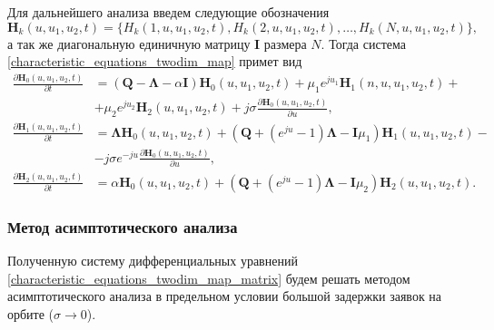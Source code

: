 Для дальнейшего анализа введем следующие обозначения
\begin{equation*}	
\boldsymbol{H}_{k}(u,u_{1},u_{2},t) = \{H_{k}(1,u,u_{1},u_{2},t),H_{k}(2,u,u_{1},u_{2},t),\dots,H_{k}(N,u,u_{1},u_{2},t)\},
\end{equation*}
а так же диагональную единичную матрицу $\boldsymbol{I}$ размера $N$.
Тогда система \eqref{characteristic_equations_twodim_map} примет вид
\begin{equation} \label{characteristic_equations_twodim_map_matrix}
	\begin{split}
		\frac{{\partial \boldsymbol{H}_{0}(u,u_{1},u_{2},t)}}{{\partial t}} &= (\boldsymbol{Q}-\boldsymbol{\Lambda}-\alpha\boldsymbol{I})\boldsymbol{H}_{0}(u,u_{1},u_{2},t) + \mu_{1} e^{ju_{1}}\boldsymbol{H}_{1}(n,u,u_{1},u_{2},t)  + \\  &+ \mu_{2}e^{ju_{2}}\boldsymbol{H}_{2}(u,u_{1},u_{2},t) + j\sigma
		\frac{{\partial \boldsymbol{H}_{0}(u,u_{1},u_{2},t)}}{{\partial u}},
		\\
		\frac{{\partial \boldsymbol{H}_{1}(u,u_{1},u_{2},t)}}{{\partial t}} &= \boldsymbol{\Lambda} \boldsymbol{H}_{0}(u,u_{1},u_{2},t) +  (\boldsymbol{Q}+(e^{ju}-1)\boldsymbol{\Lambda} - \boldsymbol{I}\mu_{1})\boldsymbol{H}_{1}(u,u_{1},u_{2},t) -\\ &- j\sigma e^{-ju}
		\frac{{\partial \boldsymbol{H}_{0}(u,u_{1},u_{2},t)}}{{\partial u}},
		\\
		\frac{{\partial \boldsymbol{H}_{2}(u,u_{1},u_{2},t)}}{{\partial t}} &= \alpha \boldsymbol{H}_{0}(u,u_{1},u_{2},t) + (\boldsymbol{Q}+(e^{ju}-1)\boldsymbol{\Lambda} - \boldsymbol{I}\mu_{2})\boldsymbol{H}_{2}(u,u_{1},u_{2},t).
	\end{split}
\end{equation} 
\subsubsection{Метод асимптотического анализа}
Полученную систему дифференциальных уравнений \eqref{characteristic_equations_twodim_map_matrix} будем решать методом асимптотического анализа в предельном условии большой задержки заявок на орбите ($\sigma \xrightarrow{} 0$).

